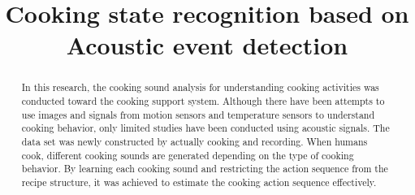 \documentclass[sigconf]{acmart}
\begin{document}
\title{Cooking state recognition based on \\ Acoustic event detection}


%

%
\begin{abstract}
  In this research, the cooking sound analysis for understanding cooking activities was conducted toward the cooking support system.
  Although there have been attempts to use images and signals from motion sensors and temperature sensors to understand cooking behavior, only limited studies have been conducted using acoustic signals.
  The data set was newly constructed by actually cooking and recording.
  When humans cook, different cooking sounds are generated depending on the type of cooking behavior. By learning each cooking sound and restricting the action sequence from the recipe structure, it was achieved to estimate the cooking action sequence effectively.
\end{abstract}
\end{document}
